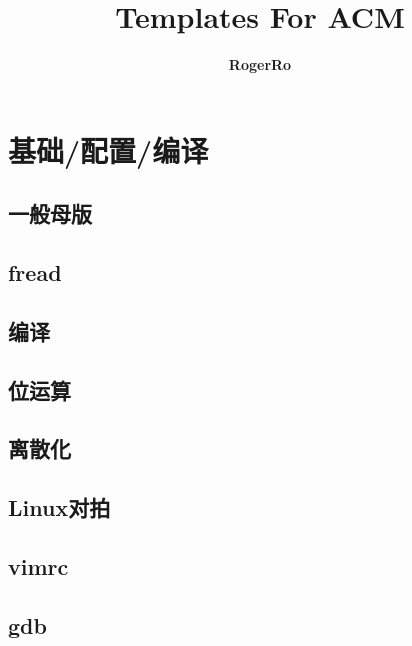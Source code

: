 \documentclass[10pt]{article}
\begin{document}
\title{\textbf{Templates For ACM}}
\date{}
\author{\textbf{RogerRo}}
\maketitle
{}
\tableofcontents
\newpage
\setcounter{page}{1}
\section{基础/配置/编译}
\subsection{一般母版}


\subsection{fread}


\subsection{编译}


\subsection{位运算}


\subsection{离散化}


\subsection{Linux对拍}


\subsection{vimrc}


\subsection{gdb}

\end{document}
